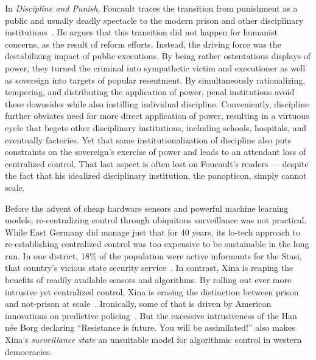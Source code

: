 
In \emph{Discipline and Punish}, Foucault traces the transition from punishment
as a public and usually deadly spectacle to the modern prison and other
disciplinary institutions~\cite{Foucault1979}. He argues that this transition
did not happen for humanist concerns, as the result of reform efforts. Instead,
the driving force was the destabilizing impact of public executions. By being
rather ostentatious displays of power, they turned the criminal into sympathetic
victim and executioner as well as sovereign into targets of popular resentment.
By simultaneously rationalizing, tempering, and distributing the application of
power, penal institutions avoid these downsides while also instilling individual
discipline. Conveniently, discipline further obviates need for more direct
application of power, resulting in a virtuous cycle that begets other
disciplinary institutions, including schools, hospitals, and eventually
factories. Yet that same institutionalization of discipline also puts
constraints on the sovereign's exercise of power and leads to an attendant loss
of centralized control. That last aspect is often lost on Foucault's readers ---
despite the fact that his idealized disciplinary institution, the panopticon,
simply cannot scale.

Before the advent of cheap hardware sensors and powerful machine learning
models, re-centralizing control through ubiquitous surveillance was not
practical. While East Germany did manage just that for 40 years, its lo-tech
approach to re-establishing centralized control was too expensive to be
sustainable in the long run. In one district, 18\% of the population were active
informants for the Stasi, that country's vicious state security
service~\cite{Kellerhoff2022}. In contrast, Xina is reaping the benefits of
readily available sensors and algorithms. By rolling out ever more intrusive yet
centralized control, Xina is erasing the distinction between prison and
not-prison at scale~\cite{Grauer2021,MozurXiaoea2022,SmithIV2016}. Ironically,
some of that is driven by American innovations on predictive
policing~\cite{PerryMcInnisea2013,SmithIV2016,Sprick2019}. But the excessive
intrusiveness of the Han n\'ee Borg declaring ``Resistance is future. You will
be assimilated!'' also makes Xina's \emph{surveillance state} an unsuitable
model for algorithmic control in western democracies.


